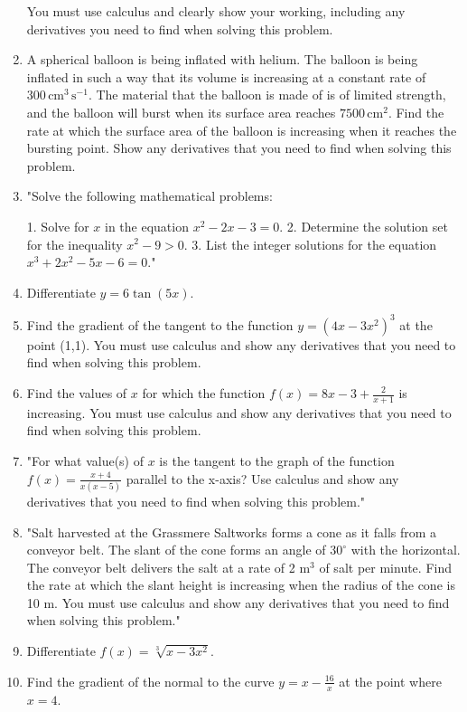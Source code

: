 \documentclass{article}
\begin{document}
\begin{enumerate}
You must use calculus and clearly show your working, including any derivatives you need to find when solving this problem.
\vspace{3cm}
\item A spherical balloon is being inflated with helium. The balloon is being inflated in such a way that its volume is increasing at a constant rate of \(300 \, \text{cm}^3 \, \text{s}^{-1}\). The material that the balloon is made of is of limited strength, and the balloon will burst when its surface area reaches \(7500 \, \text{cm}^2\). Find the rate at which the surface area of the balloon is increasing when it reaches the bursting point. Show any derivatives that you need to find when solving this problem.
\vspace{3cm}
\item "Solve the following mathematical problems:

1. Solve for \(x\) in the equation \(x^2 - 2x - 3 = 0\).
2. Determine the solution set for the inequality \(x^2 - 9 > 0\).
3. List the integer solutions for the equation \(x^3 + 2x^2 - 5x - 6 = 0\)."
\vspace{3cm}
\item Differentiate \( y = 6 \tan(5x) \).
\vspace{3cm}
\item Find the gradient of the tangent to the function \( y = (4x - 3x^2)^3 \) at the point (1,1). You must use calculus and show any derivatives that you need to find when solving this problem.
\vspace{3cm}
\item Find the values of \( x \) for which the function \( f(x) = 8x - 3 + \frac{2}{x+1} \) is increasing. You must use calculus and show any derivatives that you need to find when solving this problem.
\vspace{3cm}
\item "For what value(s) of \( x \) is the tangent to the graph of the function \( f(x) = \frac{x+4}{x(x-5)} \) parallel to the x-axis? Use calculus and show any derivatives that you need to find when solving this problem."
\vspace{3cm}
\item "Salt harvested at the Grassmere Saltworks forms a cone as it falls from a conveyor belt. The slant of the cone forms an angle of \(30^\circ\) with the horizontal. The conveyor belt delivers the salt at a rate of 2 m\(^3\) of salt per minute. Find the rate at which the slant height is increasing when the radius of the cone is 10 m. You must use calculus and show any derivatives that you need to find when solving this problem."
\vspace{3cm}
\item Differentiate \( f(x) = \sqrt[3]{x - 3x^2} \).
\vspace{3cm}
\item Find the gradient of the normal to the curve \( y = x - \frac{16}{x} \) at the point where \( x = 4 \).


\end{enumerate}
\end{document}
